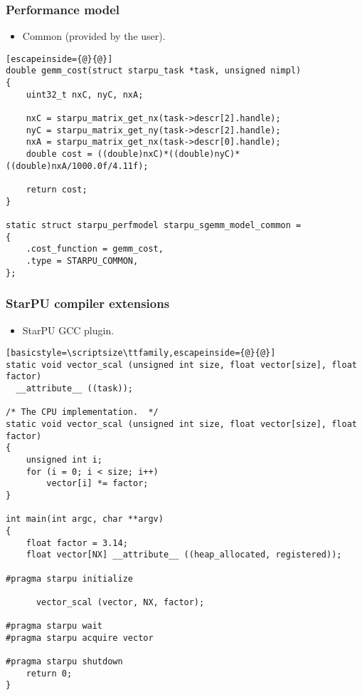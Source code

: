 \begin{frame}[fragile]
  \frametitle{Performance model}
  \begin{itemize}
  \item Common (provided by the user).
  \end{itemize}
  \begin{block}{}
\begin{lstlisting}[escapeinside={@}{@}]
double gemm_cost(struct starpu_task *task, unsigned nimpl) 
{
    uint32_t nxC, nyC, nxA;

    nxC = starpu_matrix_get_nx(task->descr[2].handle);
    nyC = starpu_matrix_get_ny(task->descr[2].handle);
    nxA = starpu_matrix_get_nx(task->descr[0].handle);
    double cost = ((double)nxC)*((double)nyC)*((double)nxA/1000.0f/4.11f);
  
    return cost;
}

static struct starpu_perfmodel starpu_sgemm_model_common =
{
    .cost_function = gemm_cost,
    .type = STARPU_COMMON,
};
\end{lstlisting}
  \end{block}
\end{frame}
\begin{frame}[fragile]
  \frametitle{StarPU compiler extensions}
  \begin{itemize}
  \item StarPU GCC plugin.
  \end{itemize}
  \begin{block}{}
\begin{lstlisting}[basicstyle=\scriptsize\ttfamily,escapeinside={@}{@}]
static void vector_scal (unsigned int size, float vector[size], float factor)
  __attribute__ ((task));

/* The CPU implementation.  */
static void vector_scal (unsigned int size, float vector[size], float factor)
{
    unsigned int i;
    for (i = 0; i < size; i++)
        vector[i] *= factor;
}

int main(int argc, char **argv)
{
    float factor = 3.14;
    float vector[NX] __attribute__ ((heap_allocated, registered));
    
#pragma starpu initialize

      vector_scal (vector, NX, factor);

#pragma starpu wait
#pragma starpu acquire vector

#pragma starpu shutdown
    return 0;
}
\end{lstlisting}
  \end{block}
\end{frame}
